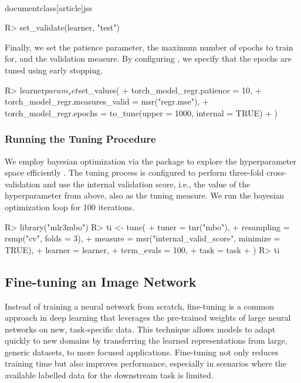 \\documentclass[article]{jss}
\theoremstyle{definition}
\begin{document}
\begin{CodeInput}
R> set_validate(learner, "test")
\end{CodeInput}

Finally, we set the patience parameter, the maximum number of epochs to train for, and the validation measure.
By configuring , we specify that the epochs are tuned using early stopping.

\begin{CodeInput}
R> learner$param_set$set_values(
+    torch_model_regr.patience = 10,
+    torch_model_regr.measures_valid = msr("regr.mse"),
+    torch_model_regr.epochs = to_tune(upper = 1000, internal = TRUE)
+  )
\end{CodeInput}

\subsubsection{Running the Tuning Procedure}

We employ bayesian optimization via the  package to explore the hyperparameter space efficiently \citep{ref-mlr3mbo}.
The tuning process is configured to perform three-fold cross-validation and use the internal validation score, i.e., the value of the  hyperparameter from above, also as the tuning measure.
We run the bayesian optimization loop for 100 iterations.

\begin{CodeInput}
R> library("mlr3mbo")
R> ti <- tune(
+    tuner = tnr("mbo"),
+    resampling = rsmp("cv", folds = 3),
+    measure = msr("internal_valid_score", minimize = TRUE),
+    learner = learner,
+    term_evals = 100,
+    task = task
+  )
R> ti
\end{CodeInput}
\begin{CodeOutput}
\end{CodeOutput}

\subsection{Fine-tuning an Image Network}\label{sec:finetuning}

Instead of training a neural network from scratch, fine-tuning is a common approach in deep learning that leverages the pre-trained weights of large neural networks on new, task-specific data.
This technique allows models to adapt quickly to new domains by transferring the learned representations from large, generic datasets, to more focused applications.
Fine-tuning not only reduces training time but also improves performance, especially in scenarios where the available labelled data for the downstream task is limited.
\end{document}
